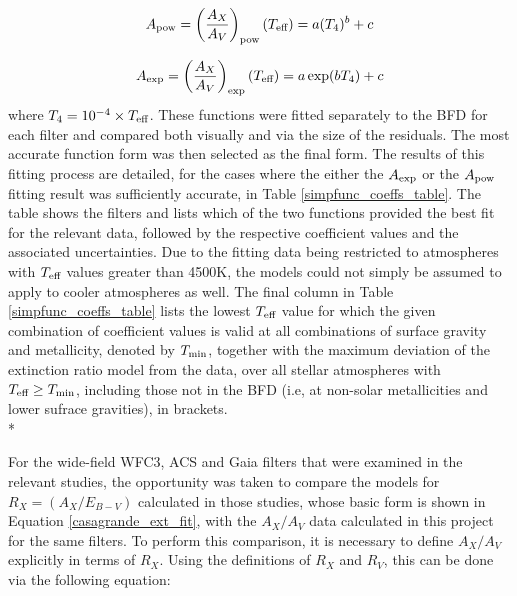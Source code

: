 \documentclass[12pt, a4paper]{report}
\begin{document}
\begin{equation}
A_{\textnormal{pow}} = \left(\frac{A_{X}}{A_{V}}\right)_{\textnormal{pow}}(T_{\textnormal{eff}}) = a (T_{4})^{b} + c
\label{Teff_pow}
\end{equation}

\begin{equation}
A_{\textnormal{exp}} = \left(\frac{A_{X}}{A_{V}}\right)_{\textnormal{exp}} (T_{\textnormal{eff}}) = a \exp(b T_{4}) + c
\label{Teff_exp}
\end{equation}
where $T_{4} = 10^{-4} \times T_{\textnormal{eff}}$. These functions were fitted separately to the BFD for each filter and compared both visually and via the size of the residuals. The most accurate function form was then selected as the final form. The results of this fitting process are detailed, for the cases where the either the $A_{\textnormal{exp}}$ or the $A_{\textnormal{pow}}$ fitting result was sufficiently accurate, in Table \ref{simpfunc_coeffs_table}. The table shows the filters and lists which of the two functions provided the best fit for the relevant data, followed by the respective coefficient values and the associated uncertainties. Due to the fitting data being restricted to atmospheres with $T_{\textnormal{eff}}$ values greater than 4500K, the models could not simply be assumed to apply to cooler atmospheres as well. The final column in Table \ref{simpfunc_coeffs_table} lists the lowest $T_{\textnormal{eff}}$ value for which the given combination of coefficient values is valid at all combinations of surface gravity and metallicity, denoted by $T_{\textnormal{min}}$, together with the maximum deviation of the extinction ratio model from the data, over all stellar atmospheres with $T_{\textnormal{eff}} \geq T_{\textnormal{min}}$, including those not in the BFD (i.e, at non-solar metallicities and lower sufrace gravities), in brackets. \\*

For the wide-field WFC3, ACS \citep{2014MNRAS.444..392C} and Gaia \citep{2018MNRAS.479L.102C} filters that were examined in the relevant studies, the opportunity was taken to compare the models for $R_{X} = (A_{X}/E_{B-V})$ calculated in those studies, whose basic form is shown in Equation \ref{casagrande_ext_fit}, with the $A_{X}/A_{V}$ data calculated in this project for the same filters. To perform this comparison, it is necessary to define $A_{X}/A_{V}$ explicitly in terms of $R_{X}$. Using the definitions of $R_{X}$ and $R_{V}$, this can be done via the following equation:
\end{document}
